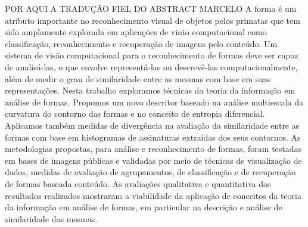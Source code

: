 {\color{red} POR AQUI A TRADUÇÃO FIEL DO ABSTRACT MARCELO}
A forma é um atributo importante no reconhecimento visual de objetos pelos primatas que tem sido amplamente explorada em  aplicações de visão computacional  como classificação, reconhecimento e recuperação de imagens pelo conteúdo. Um sistema de visão computacional para o reconhecimento de formas deve ser capaz de analisá-las, o que envolve representá-las ou descrevê-las computacionalmente, além de medir o grau de similaridade entre as mesmas com base em suas representações. Nesta trabalho exploramos técnicas da teoria da informação em análise de formas. Propomos um novo descritor baseado na análise multiescala da curvatura do contorno das formas e no conceito de entropia diferencial. Aplicamos também medidas de divergência na avaliação da similaridade entre as formas com base em histogramas de assinaturas extraídas dos seus contornos. As metodologias propostas, para análise e reconhecimento de formas, foram testadas em bases de imagens públicas  e validadas por meio de técnicas de visualização de dados, medidas de avaliação de agrupamentos, de classificação e de recuperação de formas baseada conteúdo. As avaliações qualitativa e quantitativa dos resultados realizados mostraram a viabilidade da aplicação de conceitos da teoria da informação em análise de formas, em particular na descrição e análise de similaridade das mesmas.
